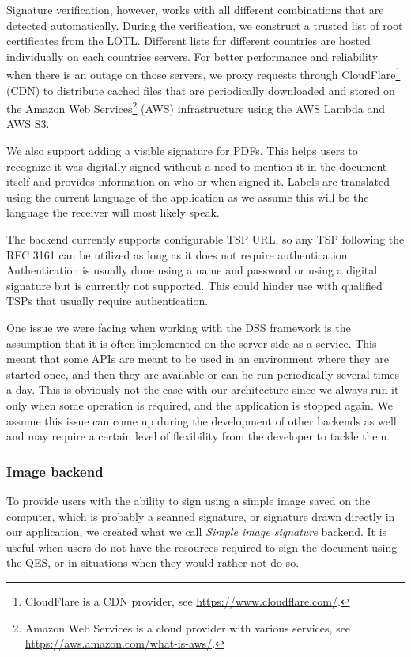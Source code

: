 \documentclass[thesismargins, english, thesislinespacing, onelinechapterstyle, upjsfrontpage]{rnthesis}
\begin{document}
Signature verification, however, works with all different combinations that are detected automatically.
During the verification, we construct a trusted list of root certificates from the LOTL.
Different lists for different countries are hosted individually on each countries servers.
For better performance and reliability when there is an outage on those servers, we proxy requests through CloudFlare\footnote{CloudFlare is a CDN provider, see \url{https://www.cloudflare.com/}.}  (CDN) to distribute cached files that are periodically downloaded and stored on the Amazon Web Services\footnote{Amazon Web Services is a cloud provider with various services, see \url{https://aws.amazon.com/what-is-aws/}.} (AWS) infrastructure using the AWS Lambda and AWS S3.

We also support adding a visible signature for PDFs.
This helps users to recognize it was digitally signed without a need to mention it in the document itself and provides information on who or when signed it.
Labels are translated using the current language of the application as we assume this will be the language the receiver will most likely speak.

The backend currently supports configurable TSP URL, so any TSP following the RFC 3161 can be utilized as long as it does not require authentication.
Authentication is usually done using a name and password or using a digital signature but is currently not supported.
This could hinder use with qualified TSPs that usually require authentication.

One issue we were facing when working with the DSS framework is the assumption that it is often implemented on the server-side as a service.
This meant that some APIs are meant to be used in an environment where they are started once, and then they are available or can be run periodically several times a day.
This is obviously not the case with our architecture since we always run it only when some operation is required, and the application is stopped again.
We assume this issue can come up during the development of other backends as well and may require a certain level of flexibility from the developer to tackle them.

\subsubsection{Image backend}

To provide users with the ability to sign using a simple image saved on the computer, which is probably a scanned signature, or signature drawn directly in our application, we created what we call \textit{Simple image signature} backend.
It is useful when users do not have the resources required to sign the document using the QES, or in situations when they would rather not do so.
\end{document}
